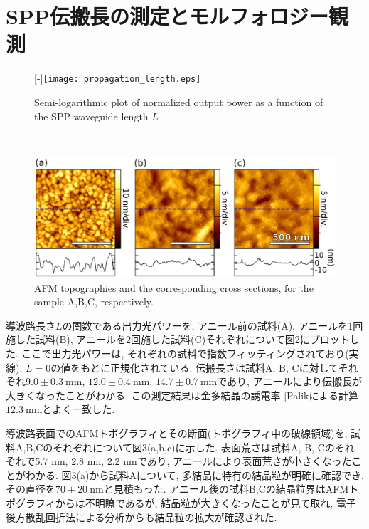 \documentclass[a4,10truept]{jsarticle}
\makeatletter
\DeclareRobustCommand\cite{\unskip
\@ifnextchar[{\@tempswatrue\@citex}{\@tempswafalse\@citex[]}}
\makeatother
\begin{document}
\vspace{-0.2em}
\section{SPP伝搬長の測定とモルフォロジー観測}
\vspace{-0.5em}
\begin{figure}
  \centering
\begin{minipage}{\hsize}
     \raisebox{0pt}[\dimexpr\height-\baselineskip\relax]{\texttt{[image: propagation\_length.eps]}}
    \caption{Semi-logarithmic plot of normalized output power as a function of the SPP waveguide length $L$}
       \label{fig:propagation_length}
\end{minipage}\\
\begin{minipage}{\hsize}
     \includegraphics[width=\hsize]{morphology.eps}
        \caption{AFM topographies and the corresponding cross sections, for the sample A,B,C, respectively.}
    \label{fig:morphology}
\end{minipage}
\end{figure}
導波路長さ$L$の関数である出力光パワーを, アニール前の試料(A), アニールを1回施した試料(B), アニールを2回施した試料(C)それぞれについて図2にプロットした. ここで出力光パワーは, それぞれの試料で指数フィッティングされており(実線), $L=0$の値をもとに正規化されている. 伝搬長さは試料A, B, Cに対してそれぞれ$9.0\pm0.3\:\mathrm{mm}$, $12.0\pm0.4\:\mathrm{mm}$, $14.7\pm0.7\:\mathrm{mm}$であり, アニールにより伝搬長が大きくなったことがわかる. この測定結果は金多結晶の誘電率\cite{Palik}による計算$12.3\:\mathrm{mm}$とよく一致した. 

導波路表面でのAFMトポグラフィとその断面(トポグラフィ中の破線領域)を, 試料A,B,Cのそれぞれについて図3(a,b,c)に示した. 表面荒さは試料A, B, Cのそれぞれで5.7 nm, 2.8 nm, 2.2 nmであり, アニールにより表面荒さが小さくなったことがわかる. 図3(a)から試料Aについて, 多結晶に特有の結晶粒が明確に確認でき, その直径を$70\pm20\:\mathrm{nm}$と見積もった. アニール後の試料B,Cの結晶粒界はAFMトポグラフィからは不明瞭であるが, 結晶粒が大きくなったことが見て取れ, 電子後方散乱回折法による分析からも結晶粒の拡大が確認された. 
\end{document}
